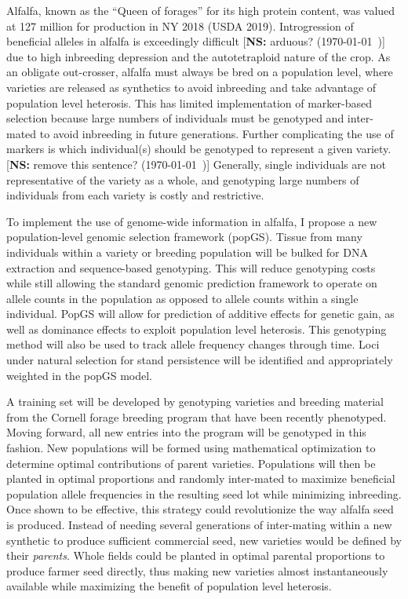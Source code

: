 \documentclass[11pt]{article}
\newcommand{\nicholas}[1]{{\color{nicholasCol} [\textbf{NS:} #1 (\today\ \currenttime)]}}
\begin{document}
Alfalfa, known as the ``Queen of forages'' for its high protein content, was valued at 127 million for production in NY 2018 (USDA 2019). Introgression of beneficial alleles in alfalfa is exceedingly difficult \nicholas{arduous?} due to high inbreeding depression and the autotetraploid nature of the crop. As an obligate out-crosser, alfalfa must always be bred on a population level, where varieties are released as synthetics to avoid inbreeding and take advantage of population level heterosis. This has limited implementation of marker-based selection because large numbers of individuals must be genotyped and inter-mated to avoid inbreeding in future generations. Further complicating the use of markers is which individual(s) should be genotyped to represent a given variety. \nicholas{remove this sentence?} Generally, single individuals are not representative of the variety as a whole, and genotyping large numbers of individuals from each variety is costly and restrictive.

To implement the use of genome-wide information in alfalfa, I propose a new population-level genomic selection framework (popGS). Tissue from many individuals within a variety or breeding population will be bulked for DNA extraction and sequence-based genotyping. This will reduce genotyping costs while still allowing the standard genomic prediction framework to operate on allele counts in the population as opposed to allele counts within a single individual. PopGS will allow for prediction of additive effects for genetic gain, as well as dominance effects to exploit population level heterosis. This genotyping method will also be used to track allele frequency changes through time. Loci under natural selection for stand persistence will be identified and appropriately weighted in the popGS model.

A training set will be developed by genotyping varieties and breeding material from the Cornell forage breeding program that have been recently phenotyped. Moving forward, all new entries into the program will be genotyped in this fashion. New populations will be formed using mathematical optimization to determine optimal contributions of parent varieties. Populations will then be planted in optimal proportions and randomly inter-mated to maximize beneficial population allele frequencies in the resulting seed lot while minimizing inbreeding. Once shown to be effective, this strategy could revolutionize the way alfalfa seed is produced. Instead of needing several generations of inter-mating within a new synthetic to produce sufficient commercial seed, new varieties would be defined by their \emph{parents}. Whole fields could be planted in optimal parental proportions to produce farmer seed directly, thus making new varieties almost instantaneously available while maximizing the benefit of population level heterosis.
\end{document}
